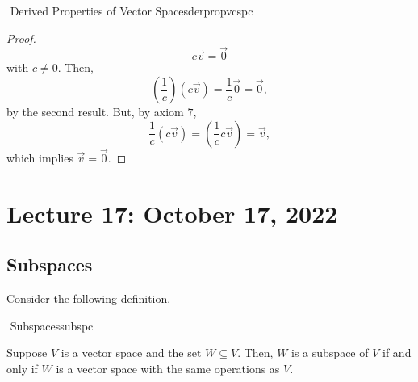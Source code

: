 \begin{theorem}{\Stop\,\,Derived Properties of Vector Spaces}{derpropvcspc}
\begin{enumerate}
\begin{proof}
                    \begin{equation*}
                        c\vec{v}=\vec{0}
                    \end{equation*}
                    with \(c\neq0\). Then,
                    \begin{equation*}
                        \left(\frac{1}{c}\right)(c\vec{v})=\frac{1}{c}\vec{0}=\vec{0},
                    \end{equation*}
                    by the second result. But, by axiom \(7\), 
                    \begin{equation*}
                        \frac{1}{c}(c\vec{v})=\left(\frac{1}{c}c\vec{v}\right)=\vec{v},
                    \end{equation*}
                    which implies \(\vec{v}=\vec{0}\).
                \end{proof}

            \end{enumerate}

        \end{theorem}

\pagebreak

\section{Lecture 17: October 17, 2022}

    \subsection{Subspaces}

        Consider the following definition.
        \begin{definition}{\Stop\,\,Subspaces}{subspc}

            Suppose \(V\) is a vector space and the set \(W\subseteq V\). Then, \(W\) is a subspace of \(V\) if and only if \(W\) is a vector space with the same operations as \(V\).
            
        \end{definition}
